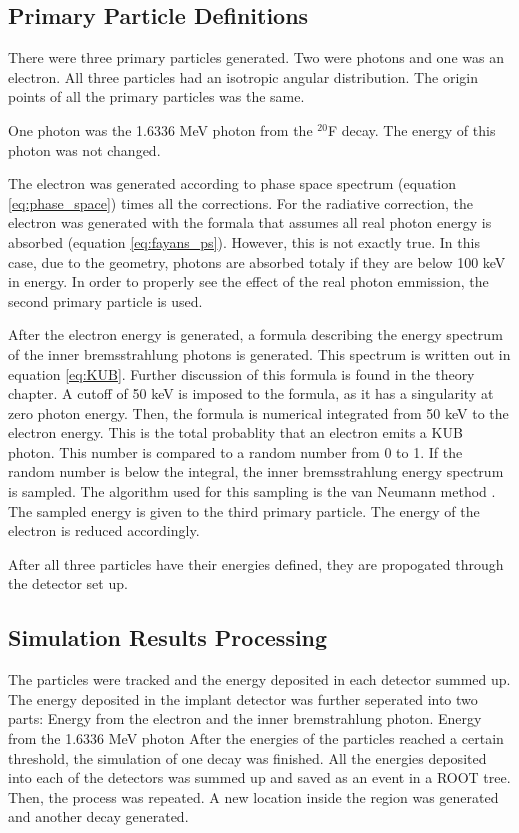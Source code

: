\subsection{Primary Particle Definitions}
There were three primary particles generated.
Two were photons and one was an electron.
All three particles had an isotropic angular distribution.
The origin points of all the primary particles was the same.

One photon was the 1.6336 MeV photon from the $^{20}$F decay.
The energy of this photon was not changed.

The electron was generated according to phase space spectrum (equation \ref{eq:phase_space}) times all the corrections.
For the radiative correction, the electron was generated with the formala that assumes all real photon energy is absorbed (equation \ref{eq:fayans_ps}).
However, this is not exactly true. 
In this case, due to the geometry, photons are absorbed totaly if they are below 100 keV in energy.
In order to properly see the effect of the real photon emmission, the second primary particle is used.

After the electron energy is generated, a formula describing the energy spectrum of the inner bremsstrahlung photons is generated. 
This spectrum is written out in equation \ref{eq:KUB}. %
Further discussion of this formula is found in the theory chapter.
A cutoff of 50 keV is imposed to the formula, as it has a singularity at zero photon energy.
Then, the formula is numerical integrated from 50 keV to the electron energy.
This is the total probablity that an electron emits a KUB photon.
This number is compared to a random number from 0 to 1.
If the random number is below the integral, the inner bremsstrahlung energy spectrum is sampled.
The algorithm used for this sampling is the van Neumann method \cite{neu51}.
The sampled energy is given to the third primary particle.
The energy of the electron is reduced accordingly.

After all three particles have their energies defined, they are propogated through the detector set up.

\subsection{Simulation Results Processing}
The particles were tracked and the energy deposited in each detector summed up.
The energy deposited in the implant detector was further seperated into two parts:
Energy from the  electron and the inner bremstrahlung photon.
Energy from the 1.6336 MeV photon
After the energies of the particles reached a certain threshold, the simulation of one decay was finished.
All the energies deposited into each of the detectors was summed up and saved as an event in a ROOT tree.
Then, the process was repeated.
A new location inside the region was generated and another decay generated.


